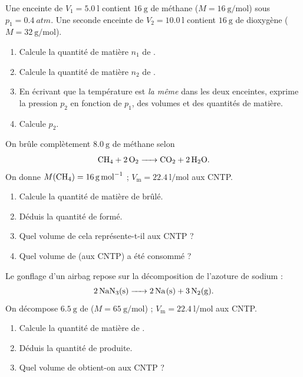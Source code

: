 \documentclass[11pt,a4paper]{article}
\begin{document}
\begin{exo}
Une enceinte de $V_1=\qty{5.0}{\litre}$ contient $\qty{16}{\gram}$ de méthane 
($M=\qty{16}{\gram\per\mole}$) sous $p_1=\qty{0.4}{atm}$. Une seconde enceinte de $V_2=\qty{10.0}{\litre}$
contient $\qty{16}{\gram}$ de dioxygène  ($M=\qty{32}{\gram\per\mole}$).
\begin{enumerate}[label=\alph*)]
  \item Calcule la quantité de matière $n_1$ de .
  \item Calcule la quantité de matière $n_2$ de .
  \item En écrivant que la température est \emph{la même} dans les deux enceintes, exprime la pression
        $p_2$ en fonction de $p_1$, des volumes et des quantités de matière.
  \item Calcule $p_2$.
\end{enumerate}
\end{exo}

\begin{exo}
On brûle complètement $\qty{8.0}{\gram}$ de méthane selon
\[ \ce{CH4 + 2 O2 -> CO2 + 2 H2O}. \]
On donne $M(\ce{CH4})=\qty{16}{\gram\per\mole}$ ; $V_{\mathrm{m}}=\qty{22.4}{\litre\per\mole}$ aux CNTP.
\begin{enumerate}[label=\alph*)]
  \item Calcule la quantité de matière de  brûlé.
  \item Déduis la quantité de  formé.
  \item Quel volume de  cela représente-t-il aux CNTP ?
  \item Quel volume de  (aux CNTP) a été consommé ?
\end{enumerate}
\end{exo}

\begin{exo}
Le gonflage d'un airbag repose sur la décomposition de l'azoture de sodium :
\[ \ce{2 NaN3(s) -> 2 Na(s) + 3 N2(g)}. \]
On décompose $\qty{6.5}{\gram}$ de  ($M=\qty{65}{\gram\per\mole}$) ;
$V_{\mathrm{m}}=\qty{22.4}{\litre\per\mole}$ aux CNTP.
\begin{enumerate}[label=\alph*)]
  \item Calcule la quantité de matière de .
  \item Déduis la quantité de  produite.
  \item Quel volume de  obtient-on aux CNTP ?
\end{enumerate}
\end{exo}
\end{document}
